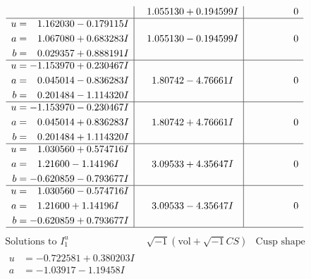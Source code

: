 \documentclass[1p]{elsarticle_modified}
\theoremstyle{definition}
\newcommand{\I}{\sqrt{-1}}
\begin{document}
$$\begin{array}{c|c|c}
 & \phantom{-}1.055130 + 0.194599 I & \phantom{-0.000000 } 0 \\ \hline\begin{aligned}
u &= \phantom{-}1.162030 - 0.179115 I \\
a &= \phantom{-}1.067080 + 0.683283 I \\
b &= \phantom{-}0.029357 + 0.888191 I\end{aligned}
 & \phantom{-}1.055130 - 0.194599 I & \phantom{-0.000000 } 0 \\ \hline\begin{aligned}
u &= -1.153970 + 0.230467 I \\
a &= \phantom{-}0.045014 - 0.836283 I \\
b &= \phantom{-}0.201484 - 1.114320 I\end{aligned}
 & \phantom{-}1.80742 - 4.76661 I & \phantom{-0.000000 } 0 \\ \hline\begin{aligned}
u &= -1.153970 - 0.230467 I \\
a &= \phantom{-}0.045014 + 0.836283 I \\
b &= \phantom{-}0.201484 + 1.114320 I\end{aligned}
 & \phantom{-}1.80742 + 4.76661 I & \phantom{-0.000000 } 0 \\ \hline\begin{aligned}
u &= \phantom{-}1.030560 + 0.574716 I \\
a &= \phantom{-}1.21600 - 1.14196 I \\
b &= -0.620859 - 0.793677 I\end{aligned}
 & \phantom{-}3.09533 + 4.35647 I & \phantom{-0.000000 } 0 \\ \hline\begin{aligned}
u &= \phantom{-}1.030560 - 0.574716 I \\
a &= \phantom{-}1.21600 + 1.14196 I \\
b &= -0.620859 + 0.793677 I\end{aligned}
 & \phantom{-}3.09533 - 4.35647 I & \phantom{-0.000000 } 0\\
 \hline 
 \end{array}$$\newpage$$\begin{array}{c|c|c}  
\text{Solutions to }I^u_{1}& \I (\text{vol} + \sqrt{-1}CS) & \text{Cusp shape}\\
 \hline 
\begin{aligned}
u &= -0.722581 + 0.380203 I \\
a &= -1.03917 - 1.19458 I \\

\end{aligned}
\end{array}$$
\end{document}
